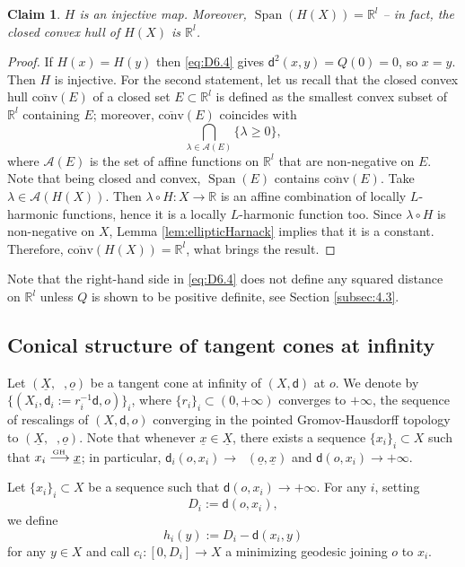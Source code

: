 \documentclass[JEP,XML,SOM,Unicode,published]{cedram}
\def\To#1{\mathchoice{\xrightarrow{\textstyle\kern4pt#1\kern3pt}}{\stackrel{#1}{\longrightarrow}}{}{}}
\newcommand{\sGH}{{\scriptscriptstyle\mathrm{GH}\,}}
\theoremstyle{plain}
\newtheorem{claim}[theorem]{Claim}
\theoremstyle{definition}
\newcommand{\setR}{\mathbb{R}}
\newcommand{\dist}{\mathsf{d}}
\DeclareMathOperator{\Span}{Span}
\newcommand{\uX}{\underline{X}}
\DeclareMathOperator{\udist}{\underline{\dist}}
\newcommand{\uo}{\underline{o}}
\newcommand{\ux}{\underline{x}}
\begin{document}
\begin{claim}\label{claim}
$H$ is an injective map. Moreover, $\Span(H(X)) = \setR^l$ -- in fact, the closed convex hull of $H(X)$ is $\setR^l$.
\end{claim}

\begin{proof}
If $H(x)=H(y)$ then \eqref{eq:D6.4} gives $\dist^2(x,y)=Q(0)=0$, so $x=y$. Then $H$ is injective. For the second statement, let us recall that the closed convex hull $\overline{\mathrm{conv}}(E)$ of a closed set $E \subset \setR^l$ is defined as the smallest convex subset of $\setR^l$ containing $E$; moreover, $\overline{\mathrm{conv}}(E)$ coincides with
\[
\bigcap_{\lambda \in \mathcal{A}(E)} \{\lambda \ge 0\},
\]
where $\mathcal{A}(E)$ is the set of affine functions on $\setR^l$ that are non-negative on $E$. Note that being closed and convex, $\Span(E)$ contains $\overline{\mathrm{conv}}(E)$. Take $\lambda \in \mathcal{A}(H(X))$. Then $\lambda \circ H: X \to \setR$ is an affine combination of locally $L$-harmonic functions, hence it is a locally $L$-harmonic function too. Since $\lambda \circ H$ is non-negative on $X$, Lemma \ref{lem:ellipticHarnack} implies that it is a constant. Therefore, $\overline{\mathrm{conv}}(H(X))=\setR^l$, what brings the result.
\end{proof}

Note that the right-hand side in \eqref{eq:D6.4} does not define any squared distance on $\setR^l$ unless $Q$ is shown to be positive definite, see Section \ref{subsec:4.3}.

\subsection{Conical structure of tangent cones at infinity}

Let $(\uX,\udist,\uo)$ be a tangent cone at infinity of $(X,\dist)$ at $o$. We denote by $\{(X_i,\dist_i:=r_i^{-1}\dist,o)\}_i$, where $\{r_i\}_i \subset (0,+\infty)$ converges to $+\infty$, the sequence of rescalings of $(X,\dist,o)$ converging in the pointed Gromov-Hausdorff topology to $(\uX,\udist,\uo)$. Note that whenever $\ux \in \uX$, there exists a sequence $\{x_i\}_i\subset X$ such that $x_i \To{\sGH} \ux$; in particular, $\dist_i(o,x_i) \to \udist(\uo,\ux)$ and $\dist(o,x_i)\to +\infty$.


Let $\{x_i\}_i \subset X$ be a sequence such that $\dist(o,x_i) \to +\infty$. For any $i$, setting
\[
D_i:=\dist(o,x_i),
\]
we define
\[
h_i(y):=D_i-\dist(x_i,y)
\]
for any $y \in X$ and call $c_i:[0,D_i] \to X$ a minimizing geodesic joining $o$ to $x_i$.
\end{document}
